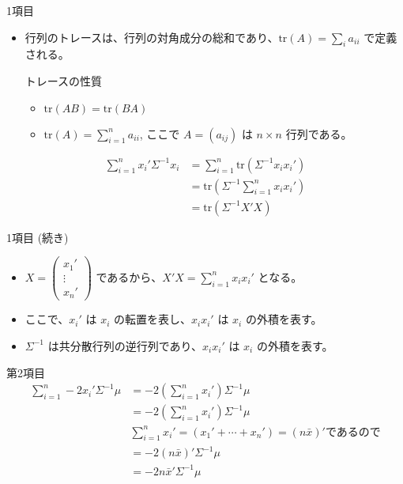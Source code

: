 \documentclass{beamer}
\begin{document}
\begin{frame}{1項目}
    \begin{itemize}
        \item 行列のトレースは、行列の対角成分の総和であり、$\text{tr}(A) = \sum_{i} a_{ii}$ で定義される。     \begin{block}{トレースの性質}
            \begin{itemize}
                \item $\text{tr}(AB) = \text{tr}(BA)$
                \item $\text{tr}(A) = \sum_{i=1}^{n} a_{ii}$, ここで $A = (a_{ij})$ は $n \times n$ 行列である。
            \end{itemize}
        \end{block}
    \end{itemize}
    \begin{align*}
    \sum_{i=1}^n x_i'\Sigma^{-1}x_i &= \sum_{i=1}^n \text{tr}\left(\Sigma^{-1} x_i x_i'\right) \\
    &= \text{tr}\left(\Sigma^{-1} \sum_{i=1}^n x_i x_i'\right) \\
    &= \text{tr}(\Sigma^{-1} X'X)
    \end{align*}
\end{frame}
\begin{frame}{1項目 (続き)} %
    \begin{itemize}
        \item $X=\begin{pmatrix}x_1' \\ \vdots \\ x_n'\end{pmatrix}$ であるから、$X'X = \sum_{i=1}^n x_ix_i'$ となる。
        \item ここで、$x_i'$ は $x_i$ の転置を表し、$x_ix_i'$ は $x_i$ の外積を表す。
        \item $\Sigma^{-1}$ は共分散行列の逆行列であり、$x_ix_i'$ は $x_i$ の外積を表す。        
    \end{itemize}
\end{frame}
\begin{frame}{第2項目}
    \begin{align*}
    \sum_{i=1}^n -2x_i'\Sigma^{-1}\mu 
    &= -2(\sum_{i=1}^n x_i') \Sigma^{-1} \mu \\
    &= -2\left(\sum_{i=1}^n x_i'\right) \Sigma^{-1} \mu \\
    &\sum_{i=1}^n x_i' =  (x_1' + \cdots + x_n') = (n\bar{x})'\text{であるので} \\
    &= -2 (n\bar{x})' \Sigma^{-1} \mu \\
    &= -2 n\bar{x}' \Sigma^{-1} \mu \\
    \end{align*}
\end{frame}
\end{document}
